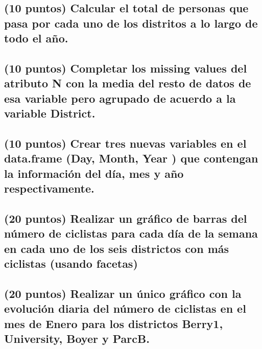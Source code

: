 \documentclass[]{article}
\begin{document}
\subsection{(10 puntos) Calcular el total de personas que pasa por cada
uno de los distritos a lo largo de todo el
año.}\label{puntos-calcular-el-total-de-personas-que-pasa-por-cada-uno-de-los-distritos-a-lo-largo-de-todo-el-ano.}

\subsection{\texorpdfstring{(10 puntos) Completar los missing values del
atributo N con la media del resto de datos de esa variable pero agrupado
de acuerdo a la variable
\textbf{District}.}{(10 puntos) Completar los missing values del atributo N con la media del resto de datos de esa variable pero agrupado de acuerdo a la variable District.}}\label{puntos-completar-los-missing-values-del-atributo-n-con-la-media-del-resto-de-datos-de-esa-variable-pero-agrupado-de-acuerdo-a-la-variable-district.}

\subsection{\texorpdfstring{(10 puntos) Crear tres nuevas variables en
el data.frame \textbf{(Day, Month, Year )} que contengan la información
del día, mes y año
respectivamente.}{(10 puntos) Crear tres nuevas variables en el data.frame (Day, Month, Year ) que contengan la información del día, mes y año respectivamente.}}\label{puntos-crear-tres-nuevas-variables-en-el-data.frame-day-month-year-que-contengan-la-informacion-del-dia-mes-y-ano-respectivamente.}

\subsection{(20 puntos) Realizar un gráfico de barras del número de
ciclistas para cada día de la semana en cada uno de los seis districtos
con más ciclistas (usando
facetas)}\label{puntos-realizar-un-grafico-de-barras-del-numero-de-ciclistas-para-cada-dia-de-la-semana-en-cada-uno-de-los-seis-districtos-con-mas-ciclistas-usando-facetas}

\subsection{\texorpdfstring{(20 puntos) Realizar un único gráfico con la
evolución diaria del número de ciclistas en el mes de Enero para los
districtos \textbf{Berry1}, \textbf{University}, \textbf{Boyer} y
\textbf{ParcB}.}{(20 puntos) Realizar un único gráfico con la evolución diaria del número de ciclistas en el mes de Enero para los districtos Berry1, University, Boyer y ParcB.}}\label{puntos-realizar-un-unico-grafico-con-la-evolucion-diaria-del-numero-de-ciclistas-en-el-mes-de-enero-para-los-districtos-berry1-university-boyer-y-parcb.}
\end{document}
